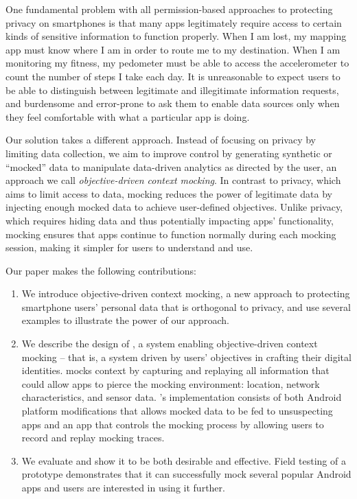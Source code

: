 One fundamental problem with all permission-based approaches to protecting
privacy on smartphones is that many apps legitimately require access to certain
kinds of sensitive information to function properly. When I am lost, my mapping
app must know where I am in order to route me to my destination. When I am
monitoring my fitness, my pedometer must be able to access the accelerometer to
count the number of steps I take each day. It is unreasonable to expect users
to be able to distinguish between legitimate and illegitimate information
requests, and burdensome and error-prone to ask them to enable data sources
only when they feel comfortable with what a particular app is doing.

Our solution takes a different approach. Instead of focusing on privacy by
limiting data collection, we aim to improve control by generating synthetic or
``mocked'' data to manipulate data-driven analytics as directed by the user, an
approach we call \textit{objective-driven context mocking}. In contrast to
privacy, which aims to limit access to data, mocking reduces the power of
legitimate data by injecting enough mocked data to achieve user-defined
objectives.  Unlike privacy, which requires hiding data and thus potentially
impacting apps' functionality, mocking ensures that apps continue to function
normally during each mocking session, making it simpler for users to understand
and use.

Our paper makes the following contributions:

\begin{enumerate}

\item We introduce objective-driven context mocking, a new approach to
protecting smartphone users' personal data that is orthogonal to privacy, and
use several examples to illustrate the power of our approach.

\item We describe the design of \PocketMocker{}, a system enabling
objective-driven context mocking -- that is, a system driven by users'
objectives in crafting their digital identities.  \PocketMocker{} mocks context
by capturing and replaying all information that could allow apps to pierce the
mocking environment: location, network characteristics, and sensor data.
\PocketMocker{}'s implementation consists of both Android platform
modifications that allows mocked data to be fed to unsuspecting apps and an app
that controls the mocking process by allowing users to record and replay
mocking traces.

\item We evaluate \PocketMocker{} and show it to be both desirable and
effective. Field testing of a \PocketMocker{} prototype demonstrates that it
can successfully mock several popular Android apps and users are interested in
using it further.

\end{enumerate}

